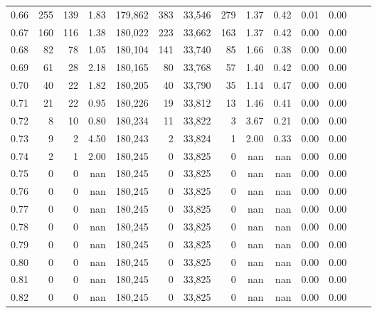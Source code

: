 \begin{tabular}{rrrrrrrrrrrrrr}
0.66 &    255 &    139 &    1.83 &  179,862 &      383 &  33,546 &     279 &  1.37 &  0.42 &  0.01 &      0.00 \\
0.67 &    160 &    116 &    1.38 &  180,022 &      223 &  33,662 &     163 &  1.37 &  0.42 &  0.00 &      0.00 \\
0.68 &     82 &     78 &    1.05 &  180,104 &      141 &  33,740 &      85 &  1.66 &  0.38 &  0.00 &      0.00 \\
0.69 &     61 &     28 &    2.18 &  180,165 &       80 &  33,768 &      57 &  1.40 &  0.42 &  0.00 &      0.00 \\
0.70 &     40 &     22 &    1.82 &  180,205 &       40 &  33,790 &      35 &  1.14 &  0.47 &  0.00 &      0.00 \\
0.71 &     21 &     22 &    0.95 &  180,226 &       19 &  33,812 &      13 &  1.46 &  0.41 &  0.00 &      0.00 \\
0.72 &      8 &     10 &    0.80 &  180,234 &       11 &  33,822 &       3 &  3.67 &  0.21 &  0.00 &      0.00 \\
0.73 &      9 &      2 &    4.50 &  180,243 &        2 &  33,824 &       1 &  2.00 &  0.33 &  0.00 &      0.00 \\
0.74 &      2 &      1 &    2.00 &  180,245 &        0 &  33,825 &       0 &   nan &   nan &  0.00 &      0.00 \\
0.75 &      0 &      0 &     nan &  180,245 &        0 &  33,825 &       0 &   nan &   nan &  0.00 &      0.00 \\
0.76 &      0 &      0 &     nan &  180,245 &        0 &  33,825 &       0 &   nan &   nan &  0.00 &      0.00 \\
0.77 &      0 &      0 &     nan &  180,245 &        0 &  33,825 &       0 &   nan &   nan &  0.00 &      0.00 \\
0.78 &      0 &      0 &     nan &  180,245 &        0 &  33,825 &       0 &   nan &   nan &  0.00 &      0.00 \\
0.79 &      0 &      0 &     nan &  180,245 &        0 &  33,825 &       0 &   nan &   nan &  0.00 &      0.00 \\
0.80 &      0 &      0 &     nan &  180,245 &        0 &  33,825 &       0 &   nan &   nan &  0.00 &      0.00 \\
0.81 &      0 &      0 &     nan &  180,245 &        0 &  33,825 &       0 &   nan &   nan &  0.00 &      0.00 \\
0.82 &      0 &      0 &     nan &  180,245 &        0 &  33,825 &       0 &   nan &   nan &  0.00 &      0.00 \\

\end{tabular}
